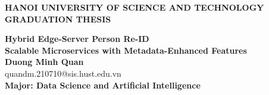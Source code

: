 \documentclass[main.tex]{subfiles}
\begin{document}
\begin{titlepage}
\thispagestyle{empty}
\begin{center}

{\textbf{\large{HANOI UNIVERSITY OF SCIENCE AND TECHNOLOGY}}}\\[4cm]

{\textbf{\huge{GRADUATION THESIS}}}\\[1cm]
{\textbf{\Large{Hybrid Edge-Server Person Re-ID\\
Scalable Microservices with Metadata-Enhanced Features}}\\[1cm]

{\textbf{\large{Duong Minh Quan}}}\\
{\large{quandm.210710@sis.hust.edu.vn}}\\[0.5cm]

{\textbf{\large{Major: Data Science and Artificial Intelligence}}}\\

\vspace{2cm}
\begin{table}[H]
\centering
{}
\end{table}}
\end{center}



\end{titlepage}
\end{document}
